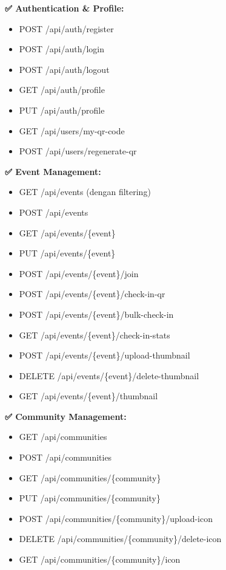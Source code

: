 \documentclass[12pt,a4paper]{article}
\begin{document}
\begin{implemented}
\textbf{✅ Authentication \& Profile:}
\begin{itemize}
    \item POST /api/auth/register
    \item POST /api/auth/login
    \item POST /api/auth/logout
    \item GET /api/auth/profile
    \item PUT /api/auth/profile
    \item GET /api/users/my-qr-code
    \item POST /api/users/regenerate-qr
\end{itemize}

\textbf{✅ Event Management:}
\begin{itemize}
    \item GET /api/events (dengan filtering)
    \item POST /api/events
    \item GET /api/events/\{event\}
    \item PUT /api/events/\{event\}
    \item POST /api/events/\{event\}/join
    \item POST /api/events/\{event\}/check-in-qr
    \item POST /api/events/\{event\}/bulk-check-in
    \item GET /api/events/\{event\}/check-in-stats
    \item POST /api/events/\{event\}/upload-thumbnail
    \item DELETE /api/events/\{event\}/delete-thumbnail
    \item GET /api/events/\{event\}/thumbnail
\end{itemize}

\textbf{✅ Community Management:}
\begin{itemize}
    \item GET /api/communities
    \item POST /api/communities
    \item GET /api/communities/\{community\}
    \item PUT /api/communities/\{community\}
    \item POST /api/communities/\{community\}/upload-icon
    \item DELETE /api/communities/\{community\}/delete-icon
    \item GET /api/communities/\{community\}/icon
\end{itemize}


\end{implemented}
\end{document}
